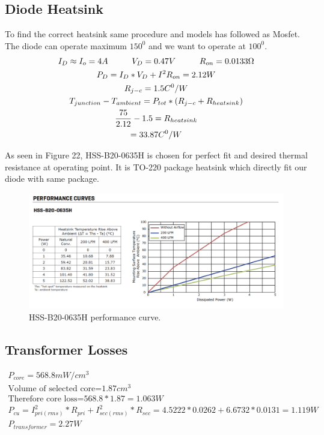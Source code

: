 \documentclass{article}
\newcommand\tab[1][1cm]{\hspace*{#1}}
\begin{document}
\subsection{Diode Heatsink}
To find the correct heatsink same procedure and models has followed as Mosfet. The diode can operate maximum $150^0$ and we want to operate at $100^0$.
\begin{gather*}
    I_D\approx I_o=4A\tab V_D=0.47V \tab R_{on}=0.0133\Omega\\ 
    P_D=I_D*V_D+I^2R_{on}=2.12W\\
     R_{j-c}=1.5 C^0/W \\
     T_{junction}-T_{ambient}= P_{tot}*( R_{j-c}+R_{heatsink})\\
     \frac{75}{2.12}-1.5=R_{heatsink}\\
     =33.87 C^0/W \\
\end{gather*}

As seen in Figure 22, HSS-B20-0635H is chosen for perfect fit and desired thermal resistance at operating point. It is TO-220 package heatsink which directly fit our diode with same package.
\begin{figure}[H]
    \centering
    \includegraphics[scale=0.4]{Ekran Resmi 2020-06-25 05.08.14.png}
    \caption{HSS-B20-0635H performance curve.}
    \label{fig:my_label}
\end{figure}


\subsection{Transformer Losses}

\begin{gather*}
      P_{core}=568.8 mW/cm^3\\
    \text{Volume of selected core=}1.87 cm^3\\
    \text{Therefore core loss=}568.8*1.87=1.063W\\
     P_{cu}=I_{pri(rms)}^2*R_{pri}+ I_{sec(rms)}^2*R_{sec}=4.5222*0.0262+6.6732*0.0131=1.119W\\
     P_{transformer}=2.27W\\
 \end{gather*}
\end{document}
